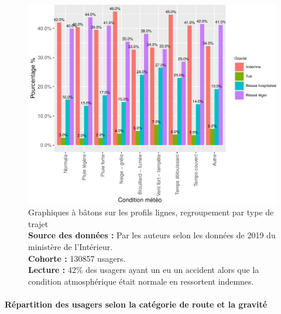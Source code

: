\documentclass[french,]{tp}
\let\oldparagraph\paragraph
\renewcommand{\paragraph}[1]{\oldparagraph{#1}\mbox{}}
\begin{document}
\begin{figure}[ht!]

{\centering \includegraphics{Prediction_Gravite_files/figure-latex/barplotatm-1} 

}

\caption{Graphiques à bâtons sur les profils lignes, regroupement par type de trajet\\
\textbf{Source des données :} Par les auteurs selon les données de 2019 du ministère de l'Intérieur.\\
\textbf{Cohorte :} 130857 usagers.\\
\textbf{Lecture :} 42\% des usagers ayant un eu un accident alors que la condition atmosphérique était normale en ressortent indemnes.}\label{fig:barplotatm}
\end{figure}

\newpage

\hypertarget{ruxe9partition-des-usagers-selon-la-catuxe9gorie-de-route-et-la-gravituxe9}{%
\paragraph{Répartition des usagers selon la catégorie de route et la gravité}\label{ruxe9partition-des-usagers-selon-la-catuxe9gorie-de-route-et-la-gravituxe9}}
\end{document}
